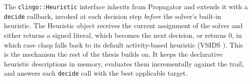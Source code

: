 The \texttt{clingo::Heuristic} interface inherits from Propagator and extends it with a \texttt{decide} callback, invoked at each decision step \emph{before} the solver's built-in heuristic. The Heuristic object receives the current assignment of the solver and either returns a signed literal, which becomes the next decision, or returns $0$, in which case clasp falls back to its default activity-based heuristic (VSIDS \cite{moskewicz2001chaff}).
This is the mechanism the rest of the thesis builds on. It keeps the declarative heuristic descriptions in memory, evaluates them incrementally against the trail, and answers each \texttt{decide} call with the best applicable target.

